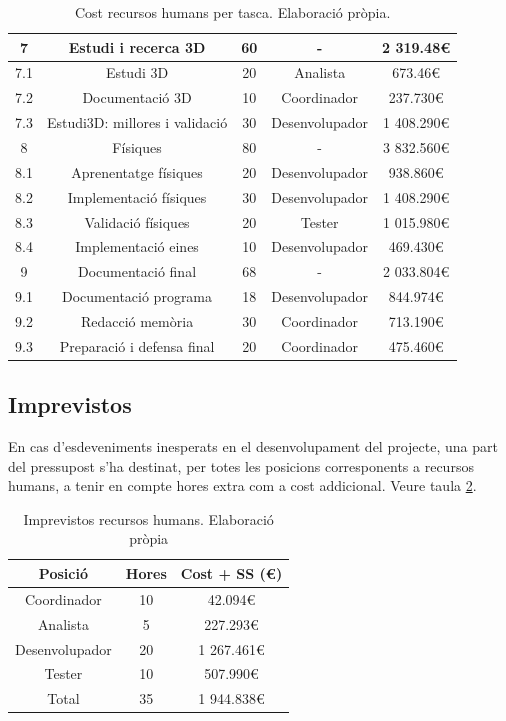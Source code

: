 \documentclass[a4paper]{report}
\begin{document}
\begin{table}
\begin{tabular}{|| c | c || c | c | c ||}
			7 & Estudi i recerca 3D & 60 & - & 2 319.48\euro \\
			\hline
			7.1 & Estudi 3D & 20 & Analista & 673.46\euro \\ 
			7.2 & Documentació 3D & 10 & Coordinador & 237.730\euro \\
			7.3 & Estudi3D: millores i validació & 30 & Desenvolupador & 1 408.290\euro \\
			\hline \hline
			8 & Físiques & 80 &  - & 3 832.560\euro \\
			\hline
			8.1 & Aprenentatge físiques & 20 & Desenvolupador & 938.860\euro \\
			8.2 & Implementació físiques & 30 & Desenvolupador & 1 408.290\euro \\
			8.3 & Validació físiques & 20 & Tester & 1 015.980\euro \\
			8.4 & Implementació eines & 10 & Desenvolupador & 469.430\euro \\
			\hline \hline
			9 & Documentació final & 68 & - & 2 033.804\euro \\
			\hline
			9.1 & Documentació programa & 18 & Desenvolupador & 844.974\euro \\
			9.2 & Redacció memòria & 30 & Coordinador & 713.190\euro \\
			9.3 & Preparació i defensa final & 20 & Coordinador & 475.460\euro \\
			\hline
		\end{tabular}
		\caption[Cost RRHH per tasca]{Cost recursos humans per tasca. Elaboració pròpia.}
		\label{table:taskCost}		
	\end{table}

	\subsection{Imprevistos}
	En cas d'esdeveniments inesperats en el desenvolupament del projecte, una part del pressupost s'ha destinat, per totes les posicions corresponents a recursos humans, a tenir en compte hores extra com a cost addicional. Veure taula \ref{table:imprevistosRH}.
	\begin{table}
		\centering
		\begin{tabular}{|| c || c | c ||}
			\hline
			\textbf{Posició} & \textbf{Hores} & \textbf{Cost + SS (\euro)} \\
			\hline \hline
			Coordinador & 10 & 42.094\euro \\
			Analista & 5 & 227.293\euro \\
			Desenvolupador & 20 & 1 267.461\euro \\
			Tester & 10 &  507.990\euro \\
			\hline \hline
			Total & 35 & 1 944.838\euro\\
			\hline
		\end{tabular}
		\caption[Imprevistos RRHH]{Imprevistos recursos humans. Elaboració pròpia}
		\label{table:imprevistosRH}
	\end{table}
\end{document}
